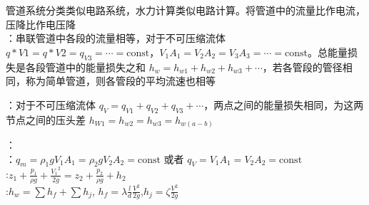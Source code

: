 管道系统分类类似电路系统，水力计算类似电路计算。将管道中的流量比作电流，压降比作电压降\\

：串联管道中各段的流量相等，对于不可压缩流体 $q*{V1}=q*{V2}=q_{V3}=\cdots=\mathrm{const}$，$V_1A_1=V_2A_2=V_3A_3=\cdots=\mathrm{const}$。总能量损失是各段管道中的能量损失之和 $h_w = h_{w1}+h_{w2}+h_{w3}+\cdots$，若各管段的管径相同，称为简单管道，则各管段的平均流速也相等

：对于不可压缩流体 $q_V = q_{V1}+q_{V2}+q_{V3}+\cdots$，两点之间的能量损失相同，为这两节点之间的压头差 $h_{W1}=h_{w2}=h_{w3}=h_{w(a-b)}$

：\\
：$q_m=\rho_1gV_1A_1=\rho_2gV_2A_2=\mathrm{const}$ 或者 $q_V = V_1A_1=V_2A_2 =\mathrm{const}$\\
:$z_1+\frac{p_1}{\rho g}+\frac{{V_1}^2}{2g}=z_2+ \frac{p_2}{\rho g}+h_2$\\
:$h_w = \sum h_f +\sum h_j$, $h_f=\lambda \frac{l}{d}\frac{V^2}{2g}$,$h_j=\zeta \frac{V^2}{2g}$\\

\divider
